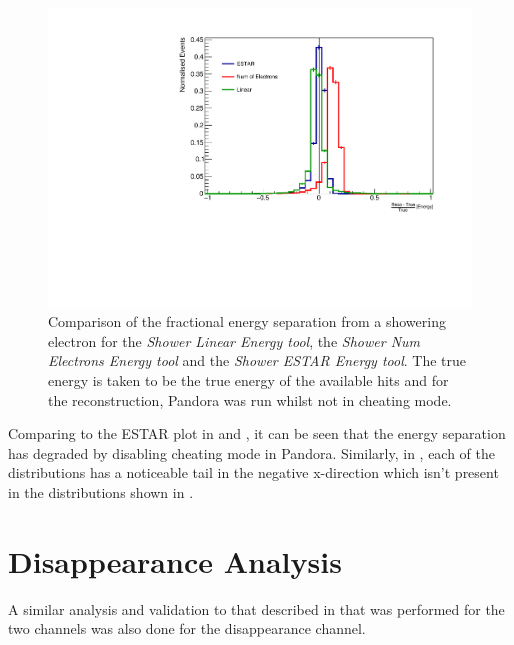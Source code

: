 \begin{figure}[h!]
    \centering
    \includegraphics[width = \largefigwidth]{figures-chap4/non_cheat/ESTAR_plane2_frac_res.pdf}
    \caption[Fractional separation of the shower energy with Pandora being run not in cheating mode.]{Comparison of the fractional energy separation from a showering electron for the \textit{Shower Linear Energy tool}, the \textit{Shower Num Electrons Energy tool} and the \textit{Shower ESTAR Energy tool}. The true energy is taken to be the true energy of the available hits and for the reconstruction, Pandora was run whilst not in cheating mode.}
    \label{fig:frac_res_no_cheat}
\end{figure}

Comparing  to the ESTAR plot in  and , it can be seen that the energy separation has degraded by disabling cheating mode in Pandora. Similarly, in , each of the distributions has a noticeable tail in the negative x-direction which isn't present in the distributions shown in .


\chapter{\texorpdfstring{\numu Disappearance Analysis}{numu Disappearance Analysis}}\label{app:numu_disapp}

A similar analysis and validation to that described in  that was performed for the two \nue channels was also done for the \numu disappearance channel.

